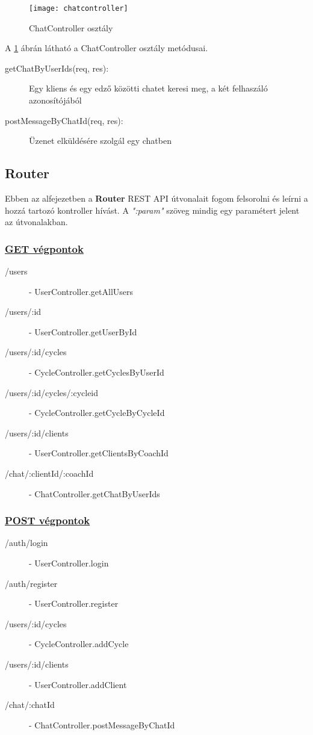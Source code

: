\begin{figure}[H]
	\centering
	\texttt{[image: chatcontroller]}
	\caption{ChatController osztály}
	\label{fig:chatcontroller}
\end{figure}

A \ref{fig:chatcontroller} ábrán látható a ChatController osztály metódusai.

\begin{description}
	\item[getChatByUserIds(req, res):] Egy kliens és egy edző közötti chatet keresi meg, a két felhaszáló azonosítójából
	\item[postMessageByChatId(req, res):] Üzenet elküldésére szolgál egy chatben
\end{description}


\subsection{Router}

Ebben az alfejezetben a \textbf{Router} REST API útvonalait fogom felsorolni és leírni a hozzá tartozó kontroller hívást. A \emph{":param"} szöveg mindig egy paramétert jelent az útvonalakban.

\subsubsection{\underline{GET végpontok}}

\begin{description}
	\item[/users] - UserController.getAllUsers
	\item[/users/:id] - UserController.getUserById 
	\item[/users/:id/cycles] - CycleController.getCyclesByUserId
	\item[/users/:id/cycles/:cycleid] - CycleController.getCycleByCycleId
	\item[/users/:id/clients] - UserController.getClientsByCoachId
	\item[/chat/:clientId/:coachId] - ChatController.getChatByUserIds
\end{description}

\subsubsection*{\underline{POST végpontok}}

\begin{description}
	\item[/auth/login] - UserController.login
	\item[/auth/register] - UserController.register
	\item[/users/:id/cycles] -  CycleController.addCycle
	\item[/users/:id/clients] - UserController.addClient
	\item[/chat/:chatId] - ChatController.postMessageByChatId
\end{description}

